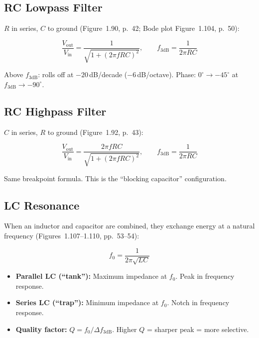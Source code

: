 \documentclass[11pt,a4paper]{article}
\begin{document}
\subsection{RC Lowpass Filter}

$R$ in series, $C$ to ground (Figure~1.90, p.~42; Bode plot Figure~1.104, p.~50):

\begin{equation}
\frac{V_{\text{out}}}{V_{\text{in}}} = \frac{1}{\sqrt{1 + (2\pi f R C)^2}}, \qquad
\boxed{f_{3\text{dB}} = \frac{1}{2\pi RC}}
\end{equation}

Above $f_{3\text{dB}}$: rolls off at $-20\,$dB/decade ($-6\,$dB/octave). Phase: $0^\circ \to -45^\circ$ at $f_{3\text{dB}} \to -90^\circ$.

\subsection{RC Highpass Filter}

$C$ in series, $R$ to ground (Figure~1.92, p.~43):

\begin{equation}
\frac{V_{\text{out}}}{V_{\text{in}}} = \frac{2\pi f R C}{\sqrt{1 + (2\pi f R C)^2}}, \qquad
f_{3\text{dB}} = \frac{1}{2\pi RC}
\end{equation}

Same breakpoint formula. This is the ``blocking capacitor'' configuration.

\subsection{LC Resonance}

When an inductor and capacitor are combined, they exchange energy at a natural frequency (Figures~1.107--1.110, pp.~53--54):

\begin{equation}
\boxed{f_0 = \frac{1}{2\pi\sqrt{LC}}}
\end{equation}

\begin{itemize}[nosep]
\item \textbf{Parallel LC (``tank''):} Maximum impedance at $f_0$. Peak in frequency response.
\item \textbf{Series LC (``trap''):} Minimum impedance at $f_0$. Notch in frequency response.
\item \textbf{Quality factor:} $Q = f_0 / \Delta f_{3\text{dB}}$. Higher $Q$ = sharper peak = more selective.
\end{itemize}
\end{document}

